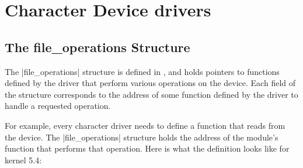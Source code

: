 \documentclass[10pt, oneside]{book}
\begin{document}
\section{Character Device drivers}
\label{sec:chardev}
\subsection{The file\_operations Structure}
\label{sec:file_operations}
The \cpp|file_operations| structure is defined in , and holds pointers to functions defined by the driver that perform various operations on the device.
Each field of the structure corresponds to the address of some function defined by the driver to handle a requested operation.

For example, every character driver needs to define a function that reads from the device.
The \cpp|file_operations| structure holds the address of the module's function that performs that operation.
Here is what the definition looks like for kernel 5.4:
\end{document}
